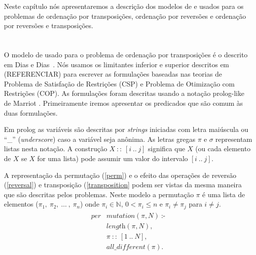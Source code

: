 Neste capítulo nós apresentaremos a descrição dos modelos de \pr{} e
\pli{} usados para os problemas de ordenação por transposições,
ordenação por reversões e ordenação por reversões e transposições.

\section{\PR}
\label{sec:cp}
O modelo de \pr{} usado para o problema de ordenação por transposições
é o descrito em Dias e Dias~\cite{DiasDias*2009}. Nós usamos os
limitantes inferior e superior descritos em (REFERENCIAR) para
escrever as formulações baseadas nas teorias de Problema de Satisfação
de Restrições (CSP) e Problema de Otimização com Restrições (COP). As
formulações foram descritas usando a notação prolog-like de
Marriot \cite{Marriott*1998}. Primeiramente iremos apresentar os
predicados que são comum às duas formulações.

Em prolog as variáveis são descritas por \textit{strings} iniciadas
com letra maiúscula ou ``\_'' (\textit{underscore}) caso a variável
seja anônima. As letras gregas $\pi$ e $\sigma$ representam listas
nesta notação. A construção $X~::~[i~..~j]$ significa que $X$ (ou cada
elemento de $X$ se $X$ for uma lista) pode assumir um valor do
intervalo $[i~..~j]$.

A representação da permutação (\ref{perm}) e o efeito das operações de
reversão (\ref{reversal}) e transposição (\ref{transposition} podem
ser vistas da mesma maneira que são descritas pelos problemas. Neste
modelo a permutação $\pi$ é uma lista de elementos
($\pi_{1},~\pi_{2},~\ldots~,~\pi_{n}$) onde $\pi_{i} \in \mathbb{N}$,
$0 < \pi_{i} \le n$ e $\pi_{i} \neq \pi_{j}$ para $i \neq j$.
\begin{align}
  \label{perm}
  \begin{split}
  \textit{per}&\textit{mutation}(\pi, N)~\text{:-} \\
  &\textit{length}(\pi, N), \\ 
  &\pi~::~[1~..~N], \\
  &\textit{all\_different}(\pi). 
  \end{split}
\end{align}

